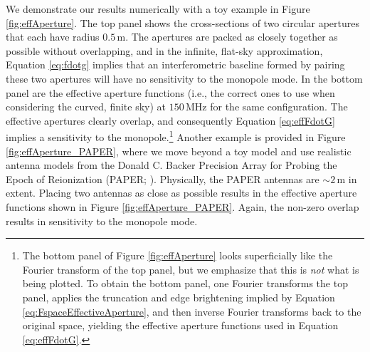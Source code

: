 \documentclass[twocolumn,apj,numberedappendix]{emulateapj}
\begin{document}
We demonstrate our results numerically with a toy example in Figure \ref{fig:effAperture}. The top panel
shows the cross-sections of two circular apertures that each have radius $0.5\,\textrm{m}$. The apertures are packed as
closely together as possible without overlapping, and in the infinite, flat-sky approximation, Equation
\eqref{eq:fdotg} implies that an interferometric baseline formed by pairing these two apertures will
have no sensitivity to the monopole mode. In the bottom panel are the effective aperture functions
(i.e., the correct ones to use when considering the curved, finite sky) at $150\,\textrm{MHz}$ for the same configuration. The effective apertures clearly overlap, and consequently Equation \eqref{eq:effFdotG} implies a sensitivity to the monopole.\footnote{The bottom panel of Figure \ref{fig:effAperture} looks superficially like the Fourier transform of the top panel, but we emphasize that this is \emph{not} what is being plotted. To obtain the bottom panel, one Fourier transforms the top panel, applies the truncation and edge brightening implied by Equation \eqref{eq:FspaceEffectiveAperture}, and then inverse Fourier transforms back to the original space, yielding the effective aperture functions used in Equation \eqref{eq:effFdotG}.} 
Another example is provided in Figure \ref{fig:effAperture_PAPER}, where we move beyond a toy model and use realistic antenna models \citep{JonnieBeam} from the Donald C. Backer Precision Array for Probing the Epoch of Reionization (PAPER; \citealt{Parsons2010}). Physically, the PAPER antennas are $\sim 2 \,\textrm{m}$ in extent. Placing two antennas as close as possible results in the effective aperture functions shown in Figure \ref{fig:effAperture_PAPER}. Again, the non-zero overlap results in sensitivity to the monopole mode.
\end{document}
